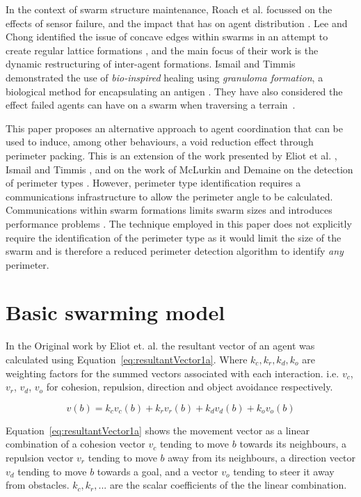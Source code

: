 \documentclass[12pt,a4paper]{IEEEtran}
\newcommand{\kc}{\mathit{k_{c}}}
\newcommand{\kr}{\mathit{k_{r}}}
\newcommand{\kd}{\mathit{k_{d}}}
\newcommand{\ko}{\mathit{k_{o}}}
\begin{document}
In the context of swarm structure maintenance, Roach et al. focussed on the effects of sensor failure, and the impact that has on agent distribution \cite{RMT:15}. Lee and Chong identified the issue of concave edges within swarms in an attempt to create regular lattice formations \cite{GN:08}, and the main focus of their work is the dynamic restructuring of inter-agent formations. Ismail and Timmis demonstrated the use of \textit{bio-inspired} healing using \textit{granuloma formation}, a biological method for encapsulating an antigen \cite{IT:10}. They have also considered the effect failed agents can have on a swarm when traversing a terrain~\cite{TIBW:16}. 

This paper proposes an alternative approach to agent coordination that can be used to induce, among other behaviours, a void reduction effect through perimeter packing. This is an extension of the work presented by Eliot et al. \cite{eliot2019void}, Ismail and Timmis \cite{IT:10,TIBW:16}, and on the work of McLurkin and Demaine on the detection of perimeter types \cite{mclurkin2009}. However, perimeter type identification requires a communications infrastructure to allow the perimeter angle to be calculated. Communications within swarm formations limits swarm sizes and introduces performance problems \cite{fu2020formation}. The technique employed in this paper does not explicitly require the identification of the perimeter type as it would limit the size of the swarm\cite{eliot2019void,GN:08} and is therefore a reduced perimeter detection algorithm to identify \textit{any} perimeter.

\section{Basic swarming model}\label{sec:basicModel}
In the Original work by Eliot et. al. the resultant vector of an agent was calculated using Equation~\ref{eq:resultantVector1a}. Where $\kc, \kr, k_d, k_o$ are weighting factors for the summed vectors associated with each interaction. i.e. $v_c$, $v_r$, $v_d$, $v_o$ for cohesion, repulsion, direction and object avoidance respectively. 

\begin{equation}\label{eq:resultantVector1a}
	v(b) = \kc v_c(b) + \kr v_r(b) + \kd v_d(b) + \ko v_o(b)
\end{equation}

Equation~\ref{eq:resultantVector1a} shows the movement vector as a linear combination of a cohesion vector $v_c$ tending to move $b$ towards its neighbours, a repulsion vector $v_r$ tending to move $b$ away from its neighbours, a direction vector  $v_d$ tending to move $b$ towards a goal, and a vector $v_o$ tending to steer it away from obstacles. $\kc, \kr, ...$ are the scalar coefficients of the the linear combination.
\end{document}
